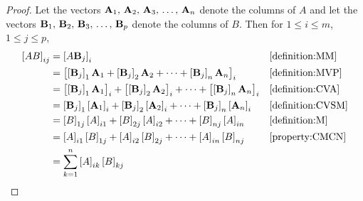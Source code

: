 \documentclass{ximera}
\begin{document}
\begin{theorem}
  \begin{proof}
    Let the vectors $\mathbf{A}_{1},\,\mathbf{A}_{2},\,\mathbf{A}_{3},\,\ldots,\,\mathbf{A}_{n}$ denote the columns of $A$ and let the vectors $\mathbf{B}_{1},\,\mathbf{B}_{2},\,\mathbf{B}_{3},\,\ldots,\,\mathbf{B}_{p}$ denote the columns of $B$.  Then for $1\leq i\leq m$, $1\leq j\leq p$,
    \begin{align*}
      \left\lbrack AB\right\rbrack_{ij}
      &=\left\lbrack A\mathbf{B}_j\right\rbrack_{i}&&\ref{definition:MM}\\
      &=\left\lbrack
        \left\lbrack\mathbf{B}_j\right\rbrack_{1}\mathbf{A}_1+
        \left\lbrack\mathbf{B}_j\right\rbrack_{2}\mathbf{A}_2+
        \cdots+
        \left\lbrack\mathbf{B}_j\right\rbrack_{n}\mathbf{A}_n
        \right\rbrack_{i}&&\ref{definition:MVP}\\
      &=
        \left\lbrack\left\lbrack\mathbf{B}_j\right\rbrack_{1}\mathbf{A}_1\right\rbrack_{i}+
        \left\lbrack\left\lbrack\mathbf{B}_j\right\rbrack_{2}\mathbf{A}_2\right\rbrack_{i}+
        \cdots+
        \left\lbrack\left\lbrack\mathbf{B}_j\right\rbrack_{n}\mathbf{A}_n\right\rbrack_{i}
                                    &&\ref{definition:CVA}\\
      &=
        \left\lbrack\mathbf{B}_j\right\rbrack_{1}\left\lbrack\mathbf{A}_1\right\rbrack_{i}+
        \left\lbrack\mathbf{B}_j\right\rbrack_{2}\left\lbrack\mathbf{A}_2\right\rbrack_{i}+
        \cdots+
        \left\lbrack\mathbf{B}_j\right\rbrack_{n}\left\lbrack\mathbf{A}_n\right\rbrack_{i}
                                    &&\ref{definition:CVSM}\\
      &=
        \left\lbrack B\right\rbrack_{1j}\left\lbrack A\right\rbrack_{i1}+
        \left\lbrack B\right\rbrack_{2j}\left\lbrack A\right\rbrack_{i2}+
        \cdots+
        \left\lbrack B\right\rbrack_{nj}\left\lbrack A\right\rbrack_{in}
                                    &&\ref{definition:M}\\
      &=
        \left\lbrack A\right\rbrack_{i1}\left\lbrack B\right\rbrack_{1j}+
        \left\lbrack A\right\rbrack_{i2}\left\lbrack B\right\rbrack_{2j}+
        \cdots+
        \left\lbrack A\right\rbrack_{in}\left\lbrack B\right\rbrack_{nj}
                                    &&\ref{property:CMCN}\\
      &=\sum_{k=1}^{n}\left\lbrack A\right\rbrack_{ik}\left\lbrack B\right\rbrack_{kj}
    \end{align*}
  \end{proof}
\end{theorem}
\end{document}
